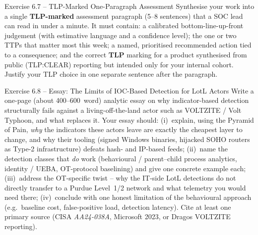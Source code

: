 \documentclass[11pt,a4paper]{article}
\begin{document}
\begin{taskbox}{Exercise 6.7 -- TLP-Marked One-Paragraph Assessment}
Synthesise your work into a single \textbf{TLP-marked} assessment paragraph (5--8 sentences)
that a SOC lead can read in under a minute. It must contain: a calibrated bottom-line-up-front
judgement (with estimative language and a confidence level); the one or two TTPs that matter
most this week; a named, prioritised recommended action tied to a consequence; and the correct
\textbf{TLP} marking for a product synthesised from public (TLP:CLEAR) reporting but intended
only for your internal cohort. Justify your TLP choice in one separate sentence after the
paragraph.
\end{taskbox}

\begin{taskbox}{Exercise 6.8 -- Essay: The Limits of IOC-Based Detection for LotL Actors}
Write a one-page (about 400--600~word) analytic essay on why indicator-based detection
structurally fails against a living-off-the-land actor such as VOLTZITE / Volt Typhoon, and
what replaces it. Your essay should: (i)~explain, using the Pyramid of Pain, \emph{why} the
indicators these actors leave are exactly the cheapest layer to change, and why their tooling
(signed Windows binaries, hijacked SOHO routers as Type-2 infrastructure) defeats hash- and
IP-based feeds; (ii)~name the detection classes that \emph{do} work (behavioural / parent--child
process analytics, identity / UEBA, OT-protocol baselining) and give one concrete example each;
(iii)~address the OT-specific twist -- why the IT-side LotL detections do not directly transfer
to a Purdue Level~1/2 network and what telemetry you would need there; (iv)~conclude with one
honest limitation of the behavioural approach (e.g.\ baseline cost, false-positive load,
detection latency). Cite at least one primary source (CISA \emph{AA24-038A}, Microsoft 2023, or
Dragos VOLTZITE reporting).
\end{taskbox}
\end{document}
